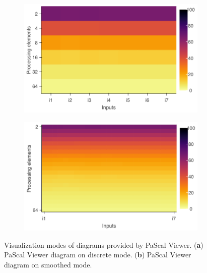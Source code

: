 \begin{figure}[H]
	\begin{subfigure}[b]{0.45\textwidth}
		\includegraphics[width=\textwidth]{pascalanalyzer/figures/results/diagram_discretevalues.pdf}
		\caption{\centering}
		\label{fig:discretevalues}
	\end{subfigure}
	\begin{subfigure}[b]{0.45\textwidth}
		\includegraphics[width=\textwidth]{pascalanalyzer/figures/results/diagram_smoothedvalues.pdf}
		\caption{\centering}
		\label{fig:smoothedvalues}
	\end{subfigure}
	
	\caption{Visualization modes of diagrams provided by PaScal Viewer. (\textbf{a}) PaScal Viewer diagram on discrete mode. (\textbf{b}) PaScal Viewer diagram on smoothed mode.}
	\label{fig:visualizationmodes}
\end{figure}



